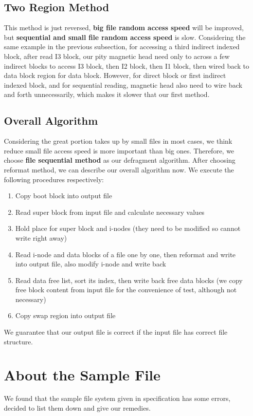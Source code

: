 \documentclass{article}
\begin{document}
	\subsection{Two Region Method}	
	This method is just reversed, \textbf{big file random access speed} will be improved, but \textbf{sequential and small file random access speed} is slow. Considering the same example in the previous subsection, for accessing a third indirect indexed block, after read I3 block, our pity magnetic head need only to across a few indirect blocks to access I3 block, then I2 block, then I1 block, then wired back to data block region for data block. However, for direct block or first indirect indexed block, and for sequential reading, magnetic head also need to wire back and forth unnecessarily, which makes it slower that our first method.
	
	\subsection{Overall Algorithm}
	Considering the great portion takes up by small files in most cases, we think reduce small file access speed is more important than big ones. Therefore, we choose \textbf{file sequential method} as our defragment algorithm. After choosing reformat method, we can describe our overall algorithm now. We execute the following procedures respectively:
	\begin{enumerate}
		\item Copy boot block into output file
		\item Read super block from input file and calculate necessary values
		\item Hold place for super block and i-nodes (they need to be modified so cannot write right away)
		\item Read i-node and data blocks of a file one by one, then reformat and write into output file, also modify i-node and write back
		\item Read data free list, sort its index, then write back free data blocks (we copy free block content from input file for the convenience of test, although not necessary)
		\item Copy swap region into output file
	\end{enumerate}
	We guarantee that our output file is correct if the input file has correct file structure.
	
	\section{About the Sample File}
	We found that the sample file system given in specification has some errors, decided to list them down and give our remedies.
	
\end{document}
